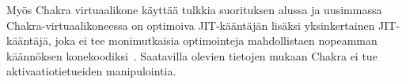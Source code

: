 Myös Chakra virtuaalikone käyttää tulkkia suorituksen alussa ja uusimmassa Chakra-virtuaalikoneessa on optimoiva JIT-kääntäjän lisäksi yksinkertainen JIT-kääntäjä, joka ei tee monimutkaisia optimointeja mahdollistaen nopeamman käännöksen konekoodiksi~\cite{chakra}. Saatavilla olevien tietojen mukaan Chakra ei tue aktivaatiotietueiden manipulointia.

\begin{comment}
\begin{itemize}
\item V8 - vain konekoodia - ei tulkkia, baseline, crankshaft(, turbofan) (TULKKI?!)
\item V8: \textbf{JS} -> AST -> native/Hydrogen (ssa) IR
\item JSC - LLInt tulkki, method jit, dfg jit, ftl jit
\item JSC JS -> AST -> \textbf{tavukoodi} (IR) -> native
\item SpiderMonkey - tulkki, traceMonkey, jägerMonkey, ionMonkey
\item SpiderMonkey: JS -> AST -> tavukoodi -> native
\item Chakra - tulkki, simple jit, full jit
\item Chakra: JS -> AST -> \textbf{tavukoodi}
\item SSA-muoto ja de-facto optimoinnit!
\end{itemize}
\end{comment}




